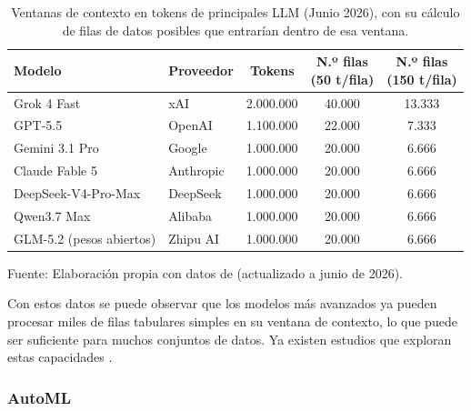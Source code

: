 \begin{table}[h]
	\centering
	\renewcommand{\arraystretch}{1.3}
	\setlength{\tabcolsep}{4pt}
	\caption{Ventanas de contexto en tokens de principales LLM (Junio 2026), con su cálculo de filas de datos posibles que entrarían dentro de esa ventana.}
	\begin{tabular}{|l|l|c|c|c|}
		\hline
		\textbf{Modelo} & \textbf{Proveedor} & \textbf{Tokens} & \shortstack{\textbf{N.º filas}\\\textbf{(50 t/fila)}} & \shortstack{\textbf{N.º filas}\\\textbf{(150 t/fila)}} \\
		\hline
		Grok 4 Fast & xAI & 2.000.000 & 40.000 & 13.333 \\
		\hline
		GPT-5.5 & OpenAI & 1.100.000 & 22.000 & 7.333 \\
		\hline
		Gemini 3.1 Pro & Google & 1.000.000 & 20.000 & 6.666 \\
		\hline
		Claude Fable 5 & Anthropic & 1.000.000 & 20.000 & 6.666 \\
		\hline
		DeepSeek-V4-Pro-Max & DeepSeek & 1.000.000 & 20.000 & 6.666 \\
		\hline
		Qwen3.7 Max & Alibaba & 1.000.000 & 20.000 & 6.666 \\
		\hline
		GLM-5.2 (pesos abiertos) & Zhipu AI & 1.000.000 & 20.000 & 6.666 \\
		\hline
	\end{tabular}
	
	\vspace{4pt}
	\footnotesize Fuente: Elaboración propia con datos de \cite{LLMLeaderboardParameters} (actualizado a junio de 2026).
\end{table}

Con estos datos se puede observar que los modelos más avanzados ya pueden procesar miles de filas tabulares simples en su ventana de contexto, lo que puede ser suficiente para muchos conjuntos de datos. Ya existen estudios que exploran estas capacidades \citep{fang2024llms}.

\subsubsection{AutoML}
\label{subsec:automl}

